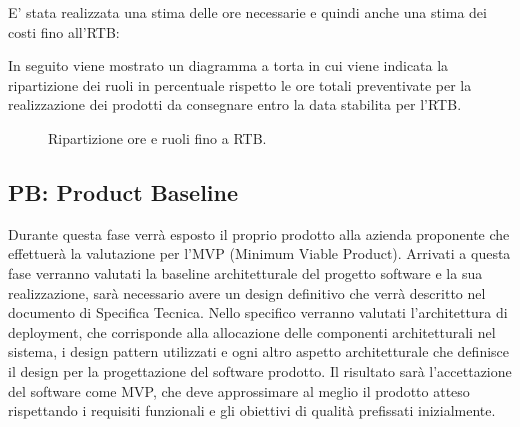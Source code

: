 E' stata realizzata una stima delle ore necessarie e quindi anche una stima dei costi fino all'RTB:
\begin{table}[H]
    \centering
    \caption{Ripartizione ore e costi fino RTB.}
    \label{tab:stima_costi_RTB} 
\end{table}

In seguito viene mostrato un diagramma a torta in cui viene indicata la ripartizione dei ruoli in percentuale rispetto le ore totali preventivate per la realizzazione dei prodotti da consegnare entro la data stabilita per l'RTB.

\begin{figure}[H]
    \centering
    \caption{Ripartizione ore e ruoli fino a RTB.}
    \label{fig:pie_ruoli_RTB}
\end{figure}

\subsection{PB: Product Baseline}
Durante questa fase verrà esposto il proprio prodotto alla azienda proponente che effettuerà la valutazione per l'MVP (Minimum Viable Product).
Arrivati a questa fase verranno valutati la baseline architetturale del progetto software e la sua realizzazione, sarà necessario avere un design definitivo 
che verrà descritto nel documento di Specifica Tecnica.
Nello specifico verranno valutati l'architettura di deployment, che corrisponde alla allocazione delle componenti architetturali nel sistema, 
i design pattern utilizzati e ogni altro aspetto architetturale che definisce il design per la progettazione del software prodotto.
Il risultato sarà l'accettazione del software come MVP, che deve approssimare al meglio il prodotto atteso rispettando i requisiti funzionali 
e gli obiettivi di qualità prefissati inizialmente.